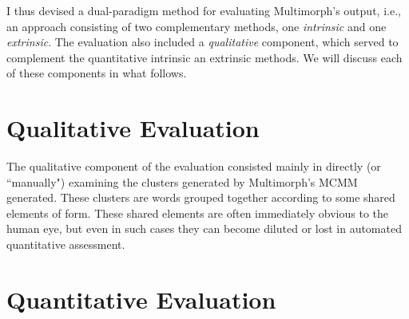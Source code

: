 
I thus devised a dual-paradigm method for evaluating Multimorph's output, i.e., an approach consisting of two complementary methods, %
one \emph{intrinsic} and one \emph{extrinsic}. 
The evaluation also included a \emph{qualitative} component, which served to complement the quantitative 
 intrinsic an extrinsic methods. We will discuss each of these components in what follows.


\section{Qualitative Evaluation} \label{sec:qualitative}
The qualitative component of the evaluation consisted mainly in directly (or ``manually") examining the clusters generated by Multimorph's MCMM generated. These clusters are words grouped together according to some shared elements of form. These shared elements are often immediately obvious to the human eye, but even in such cases they can become diluted or lost in automated quantitative assessment.   %

\section{Quantitative Evaluation}

